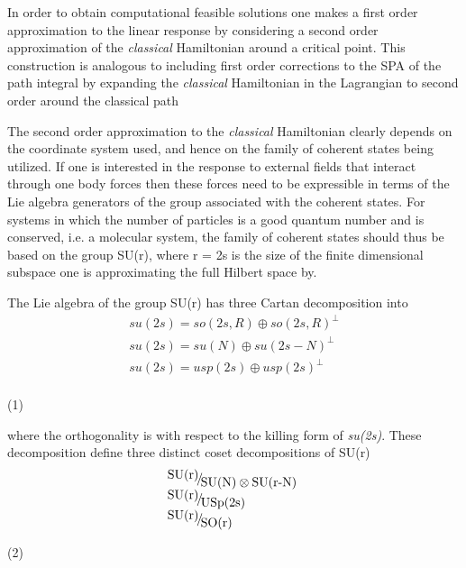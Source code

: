 \documentclass{amsart}
\begin{document}
In order to obtain computational feasible solutions one makes a first order
approximation to the linear response by considering a second order
approximation of the \textit{classical }Hamiltonian around a critical point. This construction
is analogous to including first order corrections to the SPA of the path
integral by expanding the \textit{classical }Hamiltonian in the Lagrangian to second order
around the classical path

The second order approximation to the \textit{classical }Hamiltonian clearly depends on the
coordinate system used, and hence on the family of coherent states being
utilized. If one is interested in the response to external fields that
interact through one body forces then these forces need to be expressible in
terms of the Lie algebra generators of the group associated with the
coherent states. For systems in which the number of particles is a good
quantum number and is conserved, i.e. a molecular system, the family of
coherent states should thus be based on the group SU(r), where r = 2s is the
size of the finite dimensional subspace one is approximating the full
Hilbert space by.

The Lie algebra of the group SU(r) has three Cartan decomposition into
\[
\begin{array}{l}
 su(2s)=so(2s,R)\oplus so(2s,R)^\bot \\
 su(2s)=su(N)\oplus su(2s-N)^\bot \\
 su(2s)=usp(2s)\oplus usp(2s)^\bot \\
 \end{array}
\]
\begin{center}
(1)
\end{center}

where the orthogonality is with respect to the killing form of \textit{su(2s)}. These
decomposition define three distinct coset decompositions of SU(r)
\[
\begin{array}{l}
 \raise0.7ex\hbox{${\mbox{SU(r)}}$} \!\mathord{\left/ {\vphantom
{{\mbox{SU(r)}} {\mbox{SU(N)}\otimes
\mbox{SU(r-N)}}}}\right.\kern-\nulldelimiterspace}\!\lower0.7ex\hbox{${\mbox{SU(N)}\otimes
\mbox{SU(r-N)}}$}\mbox{ } \\
 \raise0.7ex\hbox{${\mbox{SU(r)}}$} \!\mathord{\left/ {\vphantom
{{\mbox{SU(r)}}
{\mbox{USp(2s)}}}}\right.\kern-\nulldelimiterspace}\!\lower0.7ex\hbox{${\mbox{USp(2s)}}$}
\\
 \raise0.7ex\hbox{${\mbox{SU(r)}}$} \!\mathord{\left/ {\vphantom
{{\mbox{SU(r)}}
{\mbox{SO(r)}}}}\right.\kern-\nulldelimiterspace}\!\lower0.7ex\hbox{${\mbox{SO(r)}}$}
\\
 \end{array}
\]
\begin{center}
(2)
\end{center}
\end{document}
